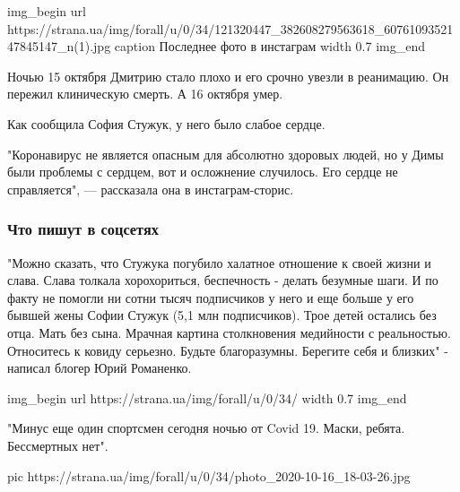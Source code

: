 \ifcmt
img_begin 
	url https://strana.ua/img/forall/u/0/34/121320447_382608279563618_6076109352147845147_n(1).jpg
	caption Последнее фото в инстаграм
	width 0.7
img_end
\fi

Ночью 15 октября Дмитрию стало плохо и его срочно увезли в
реанимацию. Он пережил клиническую смерть. А 16 октября умер.

Как сообщила София Стужук, у него было слабое сердце. 

"Коронавирус не является опасным для абсолютно здоровых людей, но у
Димы были проблемы с сердцем, вот и осложнение случилось. Его сердце
не справляется", --- рассказала она в инстаграм-сторис.

\subsubsection{Что пишут в соцсетях}

"Можно сказать, что Стужука погубило халатное отношение к своей жизни
и слава. Слава толкала хорохориться, беспечность - делать безумные
шаги. И по факту не помогли ни сотни тысяч подписчиков у него и еще
больше у его бывшей жены Софии Стужук (5,1 млн подписчиков). Трое
детей остались без отца. Мать без сына. Мрачная картина столкновения
медийности с реальностью. Относитесь к ковиду серьезно. Будьте
благоразумны. Берегите себя и близких" - написал блогер Юрий
Романенко.

\ifcmt
img_begin 
	url https://strana.ua/img/forall/u/0/34/%
	width 0.7
img_end
\fi

"Минус еще один спортсмен сегодня ночью от Covid 19. Маски, ребята.
Бессмертных нет".

\ifcmt
pic https://strana.ua/img/forall/u/0/34/photo_2020-10-16_18-03-26.jpg
\fi
